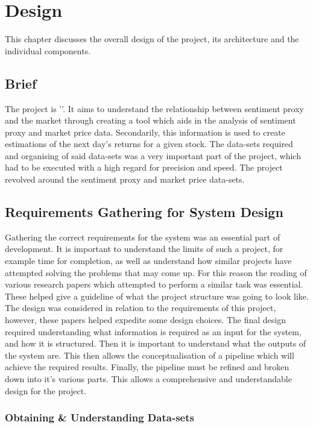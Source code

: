 
\chapter{Design}

This chapter discusses the overall design of the project, its architecture and the individual components.

\section{Brief}

The project is '\thesistitle'. It aims to understand the relationship between sentiment proxy and the market through creating a tool which aids in the analysis of sentiment proxy and market price data. Secondarily, this information is used to create estimations of the next day's returns for a given stock. The data-sets required and organising of said data-sets was a very important part of the project, which had to be executed with a high regard for precision and speed. The project revolved around the sentiment proxy and market price data-sets.

\section{Requirements Gathering for System Design}

Gathering the correct requirements for the system was an essential part of development. It is important to understand the limits of such a project, for example time for completion, as well as understand how similar projects have attempted solving the problems that may come up. For this reason the reading of various research papers which attempted to perform a similar task was essential. These helped give a guideline of what the project structure was going to look like. The design was considered in relation to the requirements of this project, however, these papers helped expedite some design choices. The final design required understanding what information is required as an input for the system, and how it is structured. Then it is important to understand what the outputs of the system are. This then allows the conceptualisation of a pipeline which will achieve the required results. Finally, the pipeline must be refined and broken down into it's various parts. This allows a comprehensive and understandable design for the project.

\subsection{Obtaining \& Understanding Data-sets}

